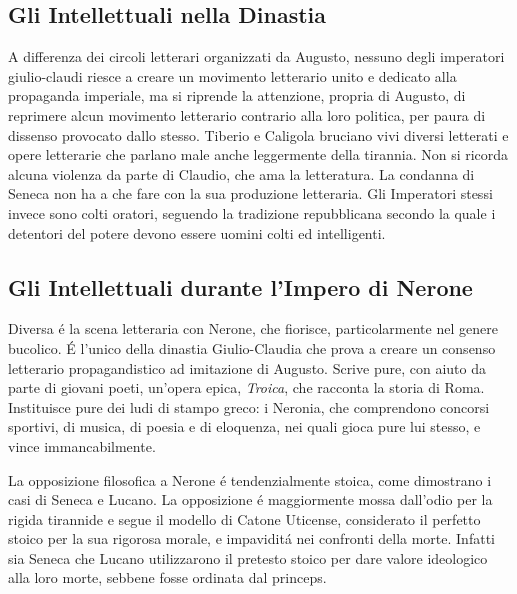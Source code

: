 \documentclass{article}
\begin{document}
\subsection{Gli Intellettuali nella Dinastia}
A differenza dei circoli letterari organizzati da Augusto, nessuno degli imperatori giulio-claudi riesce a creare un movimento letterario unito e dedicato alla propaganda imperiale, ma si riprende la attenzione, propria di Augusto, di reprimere alcun movimento letterario contrario alla loro politica, per paura di dissenso provocato dallo stesso. Tiberio e Caligola bruciano vivi diversi letterati e opere letterarie che parlano male anche leggermente della tirannia. Non si ricorda alcuna violenza da parte di Claudio, che ama la letteratura. La condanna di Seneca non ha a che fare con la sua produzione letteraria. Gli Imperatori stessi invece sono colti oratori, seguendo la tradizione repubblicana secondo la quale i detentori del potere devono essere uomini colti ed intelligenti.

\subsection{Gli Intellettuali durante l'Impero di Nerone}
Diversa é la scena letteraria con Nerone, che fiorisce, particolarmente nel genere bucolico. É l'unico della dinastia Giulio-Claudia che prova a creare un consenso letterario propagandistico ad imitazione di Augusto. Scrive pure, con aiuto da parte di giovani poeti, un'opera epica, \textit{Troica}, che racconta la storia di Roma. Instituisce pure dei ludi di stampo greco: i Neronia, che comprendono concorsi sportivi, di musica, di poesia e di eloquenza, nei quali gioca pure lui stesso, e vince immancabilmente.

La opposizione filosofica a Nerone é tendenzialmente stoica, come dimostrano i casi di Seneca e Lucano. La opposizione é maggiormente mossa dall'odio per la rigida tirannide e segue il modello di Catone Uticense, considerato il perfetto stoico per la sua rigorosa morale, e impaviditá nei confronti della morte. Infatti sia Seneca che Lucano utilizzarono il pretesto stoico per dare valore ideologico alla loro morte, sebbene fosse ordinata dal princeps.
\end{document}
